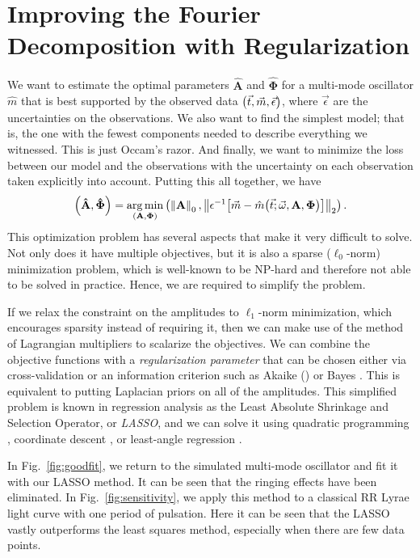 \documentclass[11pt,twoside]{book}
\begin{document}
\section{Improving the Fourier Decomposition with Regularization}
We want to estimate the optimal parameters $\mathbf {\hat A}$ and $\boldsymbol{\hat \Phi}$ for a multi-mode oscillator $\hat m$ that is best supported by the observed data $\qty(\vec t, \vec m, \vec \epsilon)$, where $\vec \epsilon$ are the uncertainties on the observations. We also want to find the simplest model; that is, the one with the fewest components needed to describe everything we witnessed. This is just Occam's razor. And finally, we want to minimize the loss between our model and the observations with the uncertainty on each observation taken explicitly into account. Putting this all together, we have
\begin{equation}
    \qty(\mathbf {\hat A}, \boldsymbol{\hat \Phi}) =
      \underset{\qty(\mathbf A, \boldsymbol \Phi)}{\arg\min} 
      \left(\left\|\mathbf{A} \right\|_0,
            \left\| \epsilon^{-1}\qty[\vec m - \hat m\qty(\vec t ; {\vec \omega}, \mathbf{A}, \boldsymbol{\Phi})]\right\|_2
      \right). 
\end{equation}
This optimization problem has several aspects that make it very difficult to solve. Not only does it have multiple objectives, but it is also a sparse ($\ell_0$-norm) minimization problem, which is well-known to be NP-hard and therefore not able to be solved in practice. Hence, we are required to simplify the problem. 

If we relax the constraint on the amplitudes to $\ell_1$-norm minimization, which encourages sparsity instead of requiring it, then we can make use of the method of Lagrangian multipliers to scalarize the objectives. We can combine the objective functions with a \emph{regularization parameter} that can be chosen either via cross-validation or an information criterion such as Akaike (\citeyear{akaike1974new}) or Bayes \citep{schwarz1978estimating}. This is equivalent to putting Laplacian priors on all of the amplitudes. This simplified problem is known in regression analysis as the Least Absolute Shrinkage and Selection Operator, or \emph{LASSO}, and we can solve it using quadratic programming \citep{tibshirani1996regression}, coordinate descent \citep{fu1998penalized}, or least-angle regression \citep{efron2004least}. 

In Fig.~\ref{fig:goodfit}, we return to the simulated multi-mode oscillator and fit it with our LASSO method. It can be seen that the ringing effects have been eliminated. In Fig.~\ref{fig:sensitivity}, we apply this method to a classical RR Lyrae light curve with one period of pulsation. Here it can be seen that the LASSO vastly outperforms the least squares method, especially when there are few data points. 
\end{document}
